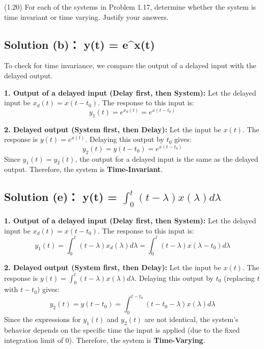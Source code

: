 \documentclass[12pt, a4paper, twoside]{ctexart}
\begin{document}


\vspace*{50pt}
\clearpage
\begin{problem}
    \heiti{} (1.20) For each of the systems in Problem 1.17, determine whether the system is time invariant or time varying. Justify your answers.
\end{problem}

\vspace*{5pt}
\subsection*{\heiti{}Solution (b)： y(t) = e^{x(t)}}
To check for time invariance, we compare the output of a delayed input with the delayed output.

\noindent\textbf{1. Output of a delayed input (Delay first, then System):}
Let the delayed input be $x_d(t) = x(t-t_0)$. The response to this input is:
\begin{equation*}
    y_1(t) = e^{x_d(t)} = e^{x(t-t_0)}
\end{equation*}

\noindent\textbf{2. Delayed output (System first, then Delay):}
Let the input be $x(t)$. The response is $y(t) = e^{x(t)}$. Delaying this output by $t_0$ gives:
\begin{equation*}
    y_2(t) = y(t-t_0) = e^{x(t-t_0)}
\end{equation*}
Since $y_1(t) = y_2(t)$, the output for a delayed input is the same as the delayed output.
Therefore, the system is \textbf{Time-Invariant}.

\vspace*{20pt}
\subsection*{\heiti{}Solution (e)： y(t) = $\int_0^t (t-\lambda)x(\lambda)d\lambda$}

\noindent\textbf{1. Output of a delayed input (Delay first, then System):}
Let the delayed input be $x_d(t) = x(t-t_0)$. The response to this input is:
\begin{equation*}
    y_1(t) = \int_0^t (t-\lambda)x_d(\lambda)d\lambda = \int_0^t (t-\lambda)x(\lambda-t_0)d\lambda
\end{equation*}

\noindent\textbf{2. Delayed output (System first, then Delay):}
Let the input be $x(t)$. The response is $y(t) = \int_0^t (t-\lambda)x(\lambda)d\lambda$. Delaying this output by $t_0$ (replacing $t$ with $t-t_0$) gives:
\begin{equation*}
    y_2(t) = y(t-t_0) = \int_0^{t-t_0} (t-t_0-\lambda)x(\lambda)d\lambda
\end{equation*}
Since the expressions for $y_1(t)$ and $y_2(t)$ are not identical, the system's behavior depends on the specific time the input is applied (due to the fixed integration limit of 0).
Therefore, the system is \textbf{Time-Varying}.
\end{document}
